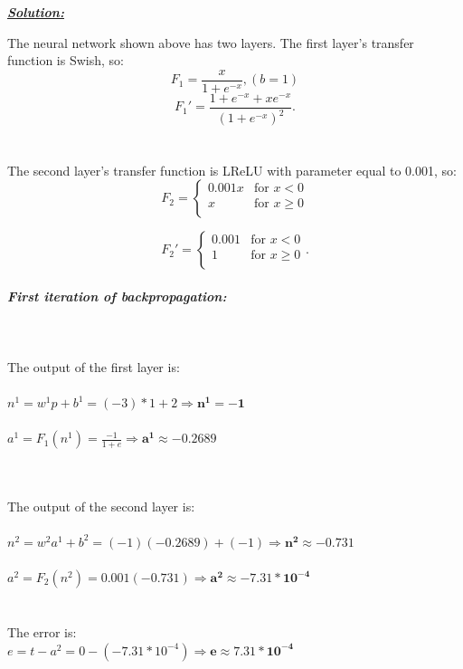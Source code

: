 \documentclass{article}
\begin{document}
\noindent \underline{\textbf{\textit{Solution:}}}

\noindent The neural network shown above has two layers. The first layer's transfer function is Swish, so:
\[ F_1 = \frac{x}{1+e^{-x}}, (b=1) \]  
\[ F_1' = \frac{1+e^{-x} + xe^{-x}}{(1+e^{-x})^2}. \]
\\ \\The second layer's transfer function is LReLU with parameter equal to 0.001, so:
\[ F_2 = \begin{cases}
  0.001x & \text{for } x < 0 \\
  x & \text{for } x \geq 0 \\
\end{cases} \]
 
\[ F_2' = \begin{cases}
  0.001 & \text{for } x < 0 \\
  1 & \text{for } x \geq 0 \\
\end{cases}. \]\\

\noindent \textbf{\textit{First iteration of backpropagation:}}
\noindent \\ \\ \\ \\The output of the first layer is: \\ \\$n^1 = w^1p + b^1 = (-3)*1 + 2 \Rightarrow \bm{n^1 = -1}$
\\ \\$a^1 = F_1(n^1) = \frac{-1}{1+e} \Rightarrow \bm{a^1 \approx -0.2689}$

\noindent \\ \\The output of the second layer is: \\ \\$n^2 = w^2a^1 + b^2 = (-1)(-0.2689) + (-1) \Rightarrow \bm{n^2 \approx -0.731}$
\\ \\$a^2 = F_2(n^2) = 0.001(-0.731) \Rightarrow \bm{a^2 \approx -7.31 * 10^{-4}}$
\\ \\ \\The error is: \\$e = t - a^2 = 0 - (-7.31 * 10^{-4}) \Rightarrow \bm{e \approx 7.31 * 10^{-4}}$ \\ \\
 
\end{document}
